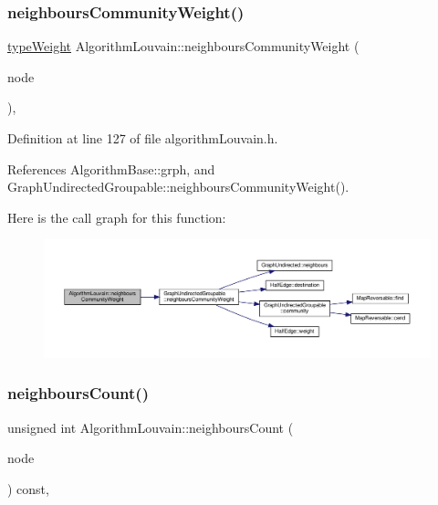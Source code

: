 \subsubsection{\texorpdfstring{neighbours\+Community\+Weight()}{neighboursCommunityWeight()}\hspace{0.1cm}{\footnotesize\ttfamily [2/2]}}
{\footnotesize\ttfamily \hyperlink{edge_8h_a2e7ea3be891ac8b52f749ec73fee6dd2}{type\+Weight} Algorithm\+Louvain\+::neighbours\+Community\+Weight (\begin{DoxyParamCaption}\item[{const \hyperlink{edge_8h_a5fbd20c46956d479cb10afc9855223f6}{type\+Vertex} \&}]{node }\end{DoxyParamCaption})\hspace{0.3cm}{\ttfamily [inline]}, {\ttfamily [private]}}



Definition at line 127 of file algorithm\+Louvain.\+h.



References Algorithm\+Base\+::grph, and Graph\+Undirected\+Groupable\+::neighbours\+Community\+Weight().

Here is the call graph for this function\+:
\nopagebreak
\begin{figure}[H]
\begin{center}
\leavevmode
\includegraphics[width=350pt]{classAlgorithmLouvain_afc30a152fabdd874d45a0728ada4ec6e_cgraph}
\end{center}
\end{figure}
\mbox{\label{classAlgorithmLouvain_ae0355167afc6ba8296f213469f6da4b0}} 
\subsubsection{\texorpdfstring{neighbours\+Count()}{neighboursCount()}}
{\footnotesize\ttfamily unsigned int Algorithm\+Louvain\+::neighbours\+Count (\begin{DoxyParamCaption}\item[{const \hyperlink{edge_8h_a5fbd20c46956d479cb10afc9855223f6}{type\+Vertex} \&}]{node }\end{DoxyParamCaption}) const\hspace{0.3cm}{\ttfamily [inline]}, {\ttfamily [private]}}



